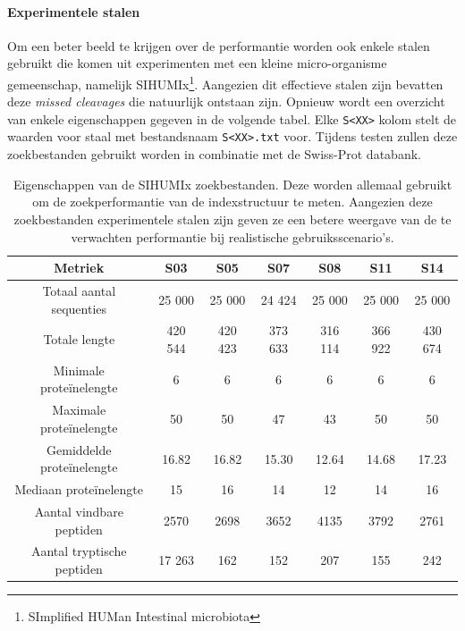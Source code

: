 \documentclass[11pt,dutch,faculty=we,layout=titlefont,underline=false,titleUppercase=true,titleUnderline=true]{ugent2016-report}
\begin{document}
    \paragraph{Experimentele stalen}
    Om een beter beeld te krijgen over de performantie worden ook enkele stalen gebruikt die komen uit experimenten met een kleine micro-organisme gemeenschap, namelijk SIHUMIx\footnote{SImplified HUMan Intestinal microbiota}\cite{SIHUMI_first_introduction, SIHUMI_frequently_used}.
    Aangezien dit effectieve stalen zijn bevatten deze \textit{missed cleavages} die natuurlijk ontstaan zijn.
    Opnieuw wordt een overzicht van enkele eigenschappen gegeven in de volgende tabel.
    Elke \texttt{S<XX>} kolom stelt de waarden voor staal met bestandsnaam \texttt{S<XX>.txt} voor.
    Tijdens testen zullen deze zoekbestanden gebruikt worden in combinatie met de Swiss-Prot databank.

    \begin{table}[h!]
        \centering
        \begin{tabular}{ c c c c c c c }
            Metriek                    & S03     & S05     & S07     & S08     & S11     & S14     \\
            \hline\hline
            Totaal aantal sequenties   & 25 000  & 25 000  & 24 424  & 25 000  & 25 000  & 25 000  \\
            Totale lengte              & 420 544 & 420 423 & 373 633 & 316 114 & 366 922 & 430 674 \\
            Minimale proteïnelengte    & 6       & 6       & 6       & 6       & 6       & 6       \\
            Maximale proteïnelengte    & 50      & 50      & 47      & 43      & 50      & 50      \\
            Gemiddelde proteïnelengte  & 16.82   & 16.82   & 15.30   & 12.64   & 14.68   & 17.23   \\
            Mediaan proteïnelengte     & 15      & 16      & 14      & 12      & 14      & 16      \\
            Aantal vindbare peptiden   & 2570    & 2698    & 3652    & 4135    & 3792    & 2761    \\
            Aantal tryptische peptiden & 17 263  & 162     & 152     & 207     & 155     & 242     \\
            \hline
        \end{tabular}
        \caption{Eigenschappen van de SIHUMIx zoekbestanden. Deze worden allemaal gebruikt om de zoekperformantie van de indexstructuur te meten. Aangezien deze zoekbestanden experimentele stalen zijn geven ze een betere weergave van de te verwachten performantie bij realistische gebruiksscenario's.}
        \label{tab:sihumi_zoekbestanden}
    \end{table}
\end{document}
